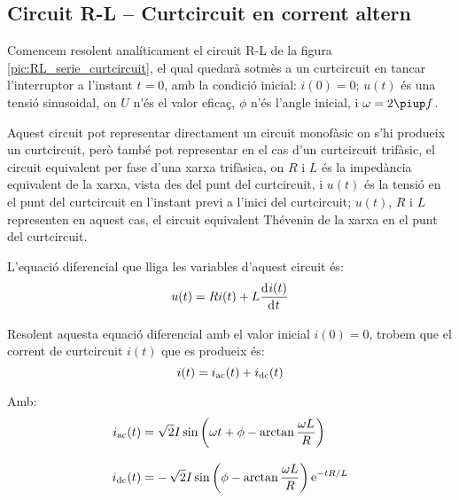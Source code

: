 \subsection {Circuit R-L -- Curtcircuit en corrent altern}\label{sec:ccRL}

Comencem resolent analíticament el circuit R-L de la figura \vref{pic:RL_serie_curtcircuit}, el qual quedarà sotmès a un curtcircuit en tancar l'interruptor a l'instant $t=0$, amb la condició inicial: $i(0) = 0$; $u(t)$ és una tensió sinusoidal, on $U$ n'és el valor eficaç, $\phi$ n'és l'angle inicial, i $\omega = 2 \piup f$.

Aquest circuit pot representar directament un circuit monofàsic on s'hi produeix un curtcircuit, però també pot representar en el cas d'un curtcircuit trifàsic,  el circuit equivalent per fase d'una xarxa trifàsica, on $R$ i $L$ és la impedància equivalent de la xarxa, vista des del punt del curtcircuit, i $u(t)$ és la tensió en el punt del curtcircuit en l'instant previ a l'inici del curtcircuit; $u(t)$,  $R$ i $L$ representen en aquest cas, el circuit equivalent Thévenin de la xarxa en el punt del curtcircuit.

\begin{center}
    
    \label{pic:RL_serie_curtcircuit}
\end{center}

L'equació diferencial que lliga les variables d'aquest circuit és:
\begin{equation}
    u(t) = R i(t) + L \deriv{i(t)}{t}
\end{equation}

Resolent aquesta equació diferencial amb el valor inicial $i(0)=0$, trobem que el corrent de curtcircuit $i(t)$  que es produeix  és:
\begin{equation}
    i(t) = i_\mathrm{ac}(t) + i_\mathrm{dc}(t)
    \label{eq:RL_serie_curtcircuit_icc}
\end{equation}

Amb:
\begin{subequations}
\begin{align}
    i_\mathrm{ac}(t) &= \sqrt{2} I \sin\left(\omega t + \phi - \arctan\frac{\omega L}{R}\right) \label{eq:RL_serie_curtcircuit_iac}\\[3mm]
    i_\mathrm{dc}(t) &= -\,\sqrt{2} I\sin\left(\phi - \arctan\frac{\omega L}{R}\right) \mathrm{e}^{-t R/L}\label{eq:RL_serie_curtcircuit_idc}
\end{align}
\end{subequations}

